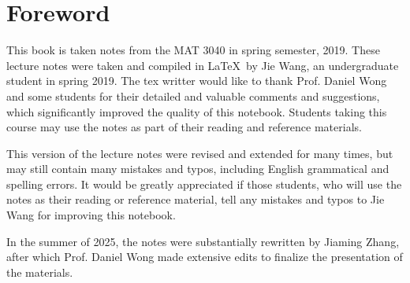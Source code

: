 \chapter*{Foreword}


This book is taken notes from the MAT 3040 in spring semester, 2019. These lecture notes were taken and compiled in \LaTeX\ by Jie Wang, an undergraduate student in spring 2019. The tex writter would like to thank Prof. Daniel Wong and some students for their detailed and valuable comments and suggestions, which significantly improved the quality of this notebook. Students taking this course may use the notes as part of their reading and reference materials. 


This version of the lecture notes were revised and extended for many times, but may still contain many mistakes and typos, including English grammatical and spelling errors. It would be greatly appreciated if those students, who will use the notes as their reading or reference material, tell any mistakes and typos to Jie Wang for improving this notebook. 


In the summer of 2025, the notes were substantially rewritten by Jiaming Zhang, after which Prof. Daniel Wong made extensive edits to finalize the presentation of the materials.